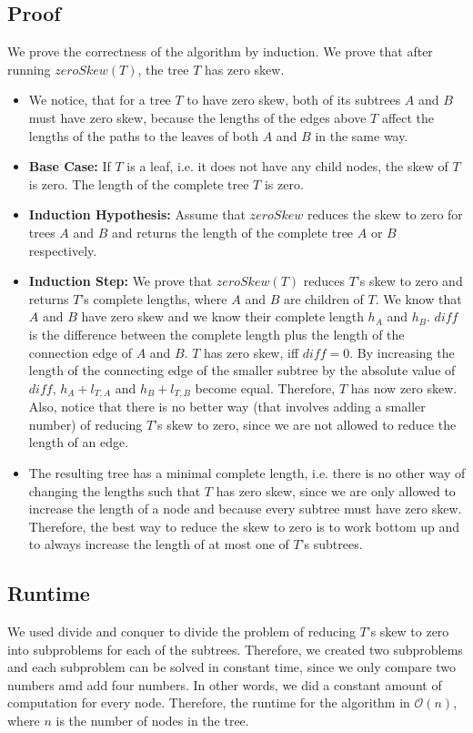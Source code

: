 \documentclass[12pt]{article}
\begin{document}
\subsection*{Proof}
We prove the correctness of the algorithm by induction. We prove that after running $\mathit{zeroSkew}(T)$, the tree $T$ has zero skew.

\begin{itemize}
	\item We notice, that for a tree $T$ to have zero skew, both of its subtrees $A$ and $B$ must have zero skew, because the lengths of the edges above $T$ affect the lengths of the paths to the leaves of both $A$ and $B$ in the same way.
	\item \textbf{Base Case:} If $T$ is a leaf, i.e. it does not have any child nodes, the skew of $T$ is zero. The length of the complete tree $T$ is zero.
	\item \textbf{Induction Hypothesis:} Assume that $\mathit{zeroSkew}$ reduces  the skew to zero for trees $A$ and $B$ and returns the length of the complete tree $A$ or $B$ respectively.
	\item \textbf{Induction Step:} We prove that $\mathit{zeroSkew}(T)$ reduces $T$'s skew to zero and returns $T$'s complete lengths, where $A$ and $B$ are children of $T$. We know that $A$ and $B$ have zero skew and we know their complete length $h_A$ and $h_B$. $\mathit{diff}$ is the difference between the complete length plus the length of the connection edge of $A$ and $B$. $T$ has zero skew, iff $\mathit{diff} = 0$. By increasing the length of the connecting edge of the smaller subtree by the absolute value of $\mathit{diff}$, $h_A + l_{T, A}$ and $h_B + l_{T, B}$ become equal. Therefore, $T$ has now zero skew. Also, notice that there is no better way (that involves adding a smaller number) of reducing $T$'s skew to zero, since we are not allowed to reduce the length of an edge.
	\item The resulting tree has a minimal complete length, i.e. there is no other way of changing the lengths such that $T$ has zero skew, since we are only allowed to increase the length of a node and because every subtree must have zero skew. Therefore, the best way to reduce the skew to zero is to work bottom up and to always increase the length of at most one of $T$'s subtrees.
\end{itemize}

\subsection*{Runtime}
We used divide and conquer to divide the problem of reducing $T$'s skew to zero into subproblems for each of the subtrees. Therefore, we created two subproblems and each subproblem can be solved in constant time, since we only compare two numbers amd add four numbers. In other words, we did a constant amount of computation for every node. Therefore, the runtime for the algorithm in $\mathcal{O}(n)$, where $n$ is the number of nodes in the tree.
\end{document}
